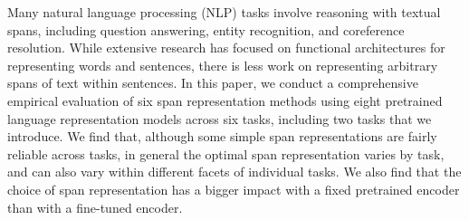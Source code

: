 Many natural language processing (NLP) tasks involve reasoning with textual spans, including question answering, entity recognition, and coreference resolution. While extensive research has focused on functional architectures for representing words and sentences, there is less work on representing arbitrary spans of text within sentences. In this paper, we conduct a comprehensive empirical evaluation of six span representation methods using eight pretrained language representation models across six tasks, including two tasks that we introduce. We find that, although some simple span representations are fairly reliable across tasks, in general the optimal span representation varies by task, and can also vary within different facets of individual tasks. We also find that the choice of span representation has a bigger impact with a fixed pretrained encoder than with a fine-tuned encoder.
